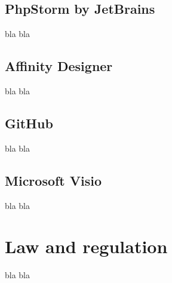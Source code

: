 \subsection{PhpStorm by JetBrains}
\label{subsec:phpstorm}
bla bla

\subsection{Affinity Designer}
\label{subsec:affinity-designer}
bla bla

\subsection{GitHub}
\label{subsec:github}
bla bla

\subsection{Microsoft Visio}
\label{subsec:ms-visio}
bla bla

\section{Law and regulation}
bla bla



